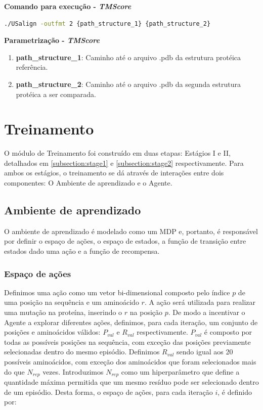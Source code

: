 \textbf{Comando para execução - \textit{TMScore}}
\begin{lstlisting}[language=bash, breaklines=true, frame=single, backgroundcolor=\color{lightgray}]
  ./USalign -outfmt 2 {path_structure_1} {path_structure_2}
\end{lstlisting}

\textbf{Parametrização - \textit{TMScore}}
\begin{enumerate}
    \item \textbf{path\_structure\_1}: Caminho até o arquivo .pdb da estrutura protéica referência. 
    \item \textbf{path\_structure\_2}: Caminho até o arquivo .pdb da segunda estrutura protéica a ser comparada. 
\end{enumerate}

\section{Treinamento}
O módulo de Treinamento foi construído em duas etapas: Estágios I e II, detalhados em \ref{subsection:stage1} e \ref{subsection:stage2} respectivamente.
Para ambos os estágios, o treinamento se dá através de interações entre dois componentes: O Ambiente de aprendizado e o Agente. 

\subsection{Ambiente de aprendizado}
O ambiente de aprendizado é modelado como um MDP e, portanto, é responsável por definir o espaço de ações, o espaço de estados, a função de transição entre estados dado uma ação e a função de recompensa.  

\subsubsection{Espaço de ações}

Definimos uma ação como um vetor bi-dimensional composto pelo índice $p$ de uma posição na sequência e um aminoácido $r$. 
A ação será utilizada para realizar uma mutação na proteína, inserindo o $r$ na posição $p$. 
De modo a incentivar o Agente a explorar diferentes ações, 
definimos, para cada iteração, um conjunto de posições e aminoácidos válidos: $P_{val}$ e $R_{val}$ respectivamente. 
$P_{val}$ é composto por todas as possíveis posições na sequência, com exceção das posições previamente selecionadas dentro do mesmo episódio. 
Definimos $R_{val}$ sendo igual aos 20 possíveis aminoácidos, com exceção dos aminoácidos que foram selecionados 
mais do que $N_{rep}$ vezes. Introduzimos $N_{rep}$ como um hiperparâmetro que define a quantidade máxima 
permitida que um mesmo resíduo pode ser selecionado dentro de um episódio.   %
Desta forma, o espaço de ações, para cada iteração $i$, é definido por:

